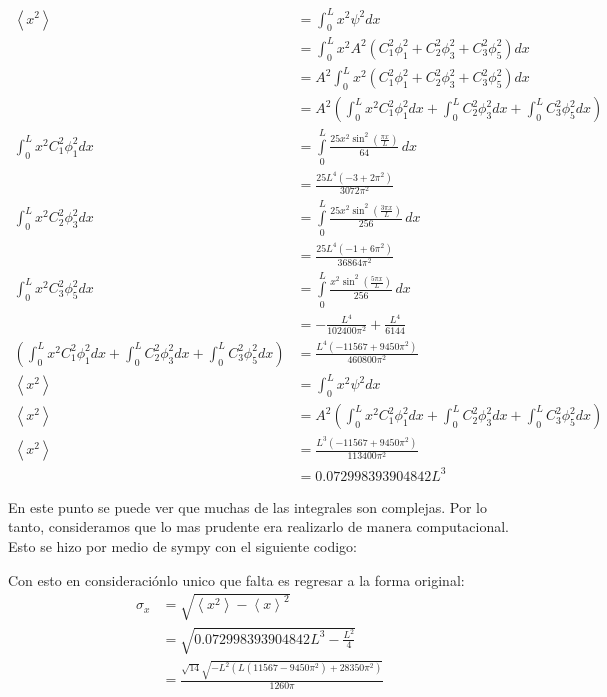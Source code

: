 \documentclass{report}
\begin{document}
\begin{align*}
  \left< x^2 \right> &= \int_0^L x^2 \psi^2 dx\\
  &= \int_0^L x^2 A^2\left(C_1^2\phi_1^2 + C_2^2\phi_3^2+ C_3^2\phi_5^2\right)dx\\
  &= A^2 \int_0^L x^2 \left(C_1^2\phi_1^2 + C_2^2\phi_3^2+ C_3^2\phi_5^2\right)dx\\
  &= A^2 \left(\int_0^L x^2 C_1^2\phi_1^2 dx+ \int_0^L C_2^2\phi_3^2 dx+ \int_0^L C_3^2\phi_5^2 dx\right)\\
  \int_0^L x^2 C_1^2\phi_1^2 dx &= \int\limits_{0}^{L} \frac{25 x^{2} \sin^{2}{\left(\frac{\pi x}{L} \right)}}{64}\, dx\\
  &=\frac{25 L^{4} \left(-3 + 2 \pi^{2}\right)}{3072 \pi^{2}}\\
  \int_0^L x^2 C_2^2\phi_3^2 dx &= \int\limits_{0}^{L} \frac{25 x^{2} \sin^{2}{\left(\frac{3 \pi x}{L} \right)}}{256}\, dx\\
  &= \frac{25 L^{4} \left(-1 + 6 \pi^{2}\right)}{36864 \pi^{2}}\\
  \int_0^L x^2 C_3^2\phi_5^2 dx &= \int\limits_{0}^{L} \frac{x^{2} \sin^{2}{\left(\frac{5 \pi x}{L} \right)}}{256}\, dx\\
  &=- \frac{L^{4}}{102400 \pi^{2}} + \frac{L^{4}}{6144}\\
  \left(\int_0^L x^2 C_1^2\phi_1^2 dx+ \int_0^L C_2^2\phi_3^2 dx+ \int_0^L C_3^2\phi_5^2 dx\right) &= \frac{L^{4} \left(-11567 + 9450 \pi^{2}\right)}{460800 \pi^{2}}\\
  \left< x^2 \right> &= \int_0^L x^2 \psi^2 dx\\
  \left< x^2 \right> &= A^2 \left(\int_0^L x^2 C_1^2\phi_1^2 dx+ \int_0^L C_2^2\phi_3^2 dx+ \int_0^L C_3^2\phi_5^2 dx\right)\\
  \left< x^2 \right> &=\frac{L^{3} \left(-11567 + 9450 \pi^{2}\right)}{113400 \pi^{2}}\\
  &= 0.072998393904842 L^{3}
\end{align*}

En este punto se puede ver que muchas de las integrales son complejas. Por lo tanto, consideramos que lo mas prudente era realizarlo de manera computacional. Esto se hizo por medio de sympy con el siguiente codigo:



Con esto en consideraciónlo unico que falta es regresar a la forma original:
\begin{align*}
  \sigma_x &= \sqrt{\left<x^2\right> - \left<x\right>^2}\\
  &= \sqrt{0.072998393904842 L^{3} - \frac{L^2}{4}}\\
  &= \frac{\sqrt{14} \sqrt{- L^{2} \left(L \left(11567 - 9450 \pi^{2}\right) + 28350 \pi^{2}\right)}}{1260 \pi}
\end{align*}
\end{document}
